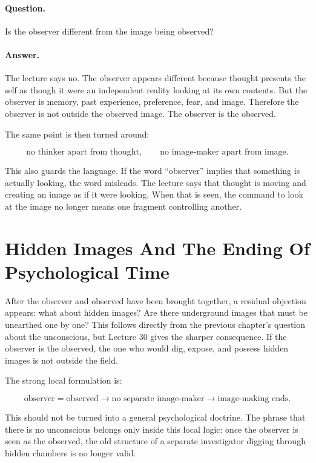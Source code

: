 \documentclass[11pt,oneside]{book}
\begin{document}
\paragraph{Question.}
Is the observer different from the image being observed?

\paragraph{Answer.}
The lecture says no. The observer appears different because thought presents the self as though it were an independent reality looking at its own contents. But the observer is memory, past experience, preference, fear, and image. Therefore the observer is not outside the observed image. The observer is the observed.

The same point is then turned around:

\begin{equation}
\text{no thinker apart from thought},
\qquad
\text{no image-maker apart from image}.
\end{equation}

This also guards the language. If the word ``observer'' implies that something is actually looking, the word misleads. The lecture says that thought is moving and creating an image as if it were looking. When that is seen, the command to look at the image no longer means one fragment controlling another.

\section{Hidden Images And The Ending Of Psychological Time}

After the observer and observed have been brought together, a residual objection appears: what about hidden images? Are there underground images that must be unearthed one by one? This follows directly from the previous chapter's question about the unconscious, but Lecture 30 gives the sharper consequence. If the observer is the observed, the one who would dig, expose, and possess hidden images is not outside the field.

The strong local formulation is:

\begin{equation}
\text{observer} = \text{observed}
\longrightarrow
\text{no separate image-maker}
\longrightarrow
\text{image-making ends}.
\end{equation}

This should not be turned into a general psychological doctrine. The phrase that there is no unconscious belongs only inside this local logic: once the observer is seen as the observed, the old structure of a separate investigator digging through hidden chambers is no longer valid.
\end{document}
